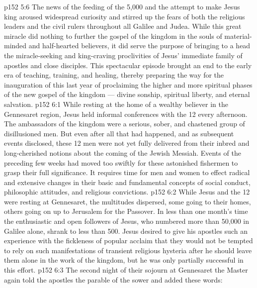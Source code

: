 \vs p152 5:6 The news of the feeding of the 5,000 and the attempt to make Jesus king aroused widespread curiosity and stirred up the fears of both the religious leaders and the civil rulers throughout all Galilee and Judea. While this great miracle did nothing to further the gospel of the kingdom in the souls of material\hyp{}minded and half\hyp{}hearted believers, it did serve the purpose of bringing to a head the miracle\hyp{}seeking and king\hyp{}craving proclivities of Jesus’ immediate family of apostles and close disciples. This spectacular episode brought an end to the early era of teaching, training, and healing, thereby preparing the way for the inauguration of this last year of proclaiming the higher and more spiritual phases of the new gospel of the kingdom --- divine sonship, spiritual liberty, and eternal salvation.
\vs p152 6:1 While resting at the home of a wealthy believer in the Gennesaret region, Jesus held informal conferences with the 12 every afternoon. The ambassadors of the kingdom were a serious, sober, and chastened group of disillusioned men. But even after all that had happened, and as subsequent events disclosed, these 12 men were not yet fully delivered from their inbred and long\hyp{}cherished notions about the coming of the Jewish Messiah. Events of the preceding few weeks had moved too swiftly for these astonished fishermen to grasp their full significance. It requires time for men and women to effect radical and extensive changes in their basic and fundamental concepts of social conduct, philosophic attitudes, and religious convictions.
\vs p152 6:2 While Jesus and the 12 were resting at Gennesaret, the multitudes dispersed, some going to their homes, others going on up to Jerusalem for the Passover. In less than one month’s time the enthusiastic and open followers of Jesus, who numbered more than 50,000 in Galilee alone, shrank to less than 500. Jesus desired to give his apostles such an experience with the fickleness of popular acclaim that they would not be tempted to rely on such manifestations of transient religious hysteria after he should leave them alone in the work of the kingdom, but he was only partially successful in this effort.
\vs p152 6:3 \pc The second night of their sojourn at Gennesaret the Master again told the apostles the parable of the sower and added these words: 
